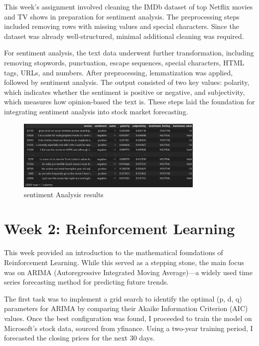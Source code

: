 \documentclass[12pt,a4paper]{article}
\begin{document}
This week’s assignment involved cleaning the IMDb dataset of top Netflix movies and TV shows in preparation for sentiment analysis. The preprocessing steps included removing rows with missing values and special characters. Since the dataset was already well-structured, minimal additional cleaning was required.

For sentiment analysis, the text data underwent further transformation, including removing stopwords, punctuation, escape sequences, special characters, HTML tags, URLs, and numbers. After preprocessing, lemmatization was applied, followed by sentiment analysis. The output consisted of two key values: polarity, which indicates whether the sentiment is positive or negative, and subjectivity, which measures how opinion-based the text is. These steps laid the foundation for integrating sentiment analysis into stock market forecasting.

\begin{figure}[!h]
    \centering
    \includegraphics[width=0.8\textwidth]{Week1_Sentiment_results.png} %
    \caption{sentiment Analysis results}
    \label{fig4}
\end{figure}

\section{Week 2: Reinforcement Learning}
This week provided an introduction to the mathematical foundations of Reinforcement Learning. While this served as a stepping stone, the main focus was on ARIMA (Autoregressive Integrated Moving Average)—a widely used time series forecasting method for predicting future trends.

The first task was to implement a grid search to identify the optimal (p, d, q) parameters for ARIMA by comparing their Akaike Information Criterion (AIC) values. Once the best configuration was found, I proceeded to train the model on Microsoft's stock data, sourced from yfinance. Using a two-year training period, I forecasted the closing prices for the next 30 days.
\end{document}
